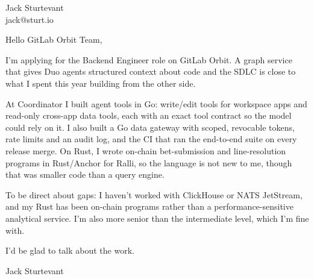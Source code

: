 \documentclass[11pt]{article}
\begin{document}
\raggedright

{\namefont\fontsize{20pt}{24pt}\selectfont Jack Sturtevant}\\[-0.3em]
jack@sturt.io

\vspace{1.2em}

Hello GitLab Orbit Team,

I'm applying for the Backend Engineer role on GitLab Orbit. A graph service that gives Duo agents structured context about code and the SDLC is close to what I spent this year building from the other side.

At Coordinator I built agent tools in Go: write/edit tools for workspace apps and read-only cross-app data tools, each with an exact tool contract so the model could rely on it. I also built a Go data gateway with scoped, revocable tokens, rate limits and an audit log, and the CI that ran the end-to-end suite on every release merge. On Rust, I wrote on-chain bet-submission and line-resolution programs in Rust/Anchor for Ralli, so the language is not new to me, though that was smaller code than a query engine.

To be direct about gaps: I haven't worked with ClickHouse or NATS JetStream, and my Rust has been on-chain programs rather than a performance-sensitive analytical service. I'm also more senior than the intermediate level, which I'm fine with.

I'd be glad to talk about the work.

\vspace{0.6em}
Jack Sturtevant
\end{document}
